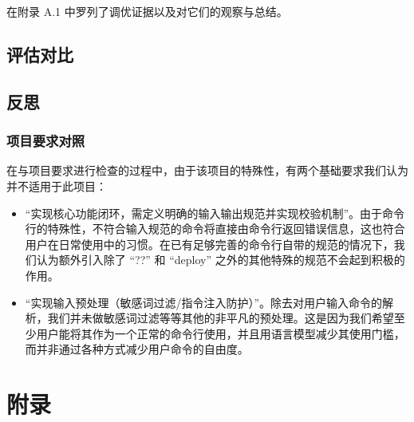 \documentclass{article}
\theoremstyle{plain}
\theoremstyle{definition}
\theoremstyle{remark}
\begin{document}
在附录 A.1 中罗列了调优证据以及对它们的观察与总结。

\subsection{评估对比}


\subsection{反思}

\subsubsection{项目要求对照}

在与项目要求进行检查的过程中，由于该项目的特殊性，有两个基础要求我们认为并不适用于此项目：


\begin{itemize}
\item “实现核心功能闭环，需定义明确的输入输出规范并实现校验机制”。由于命令行的特殊性，不符合输入规范的命令将直接由命令行返回错误信息，这也符合用户在日常使用中的习惯。在已有足够完善的命令行自带的规范的情况下，我们认为额外引入除了 “??” 和 “deploy” 之外的其他特殊的规范不会起到积极的作用。

\item “实现输入预处理（敏感词过滤/指令注入防护）”。除去对用户输入命令的解析，我们并未做敏感词过滤等等其他的非平凡的预处理。这是因为我们希望至少用户能将其作为一个正常的命令行使用，并且用语言模型减少其使用门槛，而并非通过各种方式减少用户命令的自由度。
\end{itemize}





\newpage
\appendix
\onecolumn
\section{附录}

\end{document}
